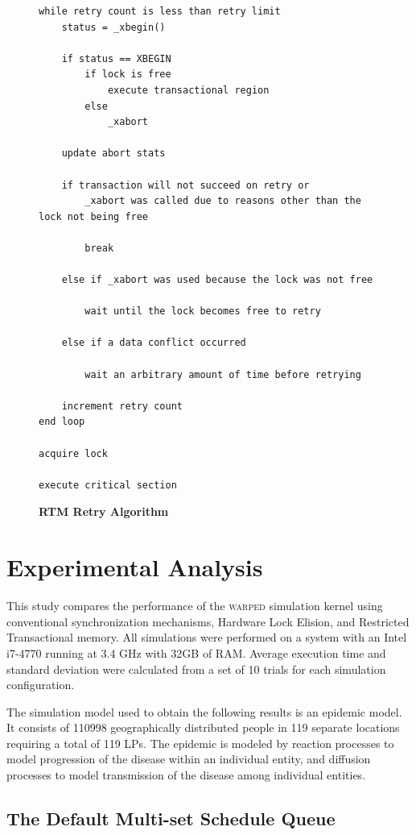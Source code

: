 \documentclass[11pt]{book}
\begin{document}
\begin{figure}
\begin{verbatim}
while retry count is less than retry limit
    status = _xbegin()

    if status == XBEGIN
        if lock is free
            execute transactional region
        else
            _xabort

    update abort stats

    if transaction will not succeed on retry or 
        _xabort was called due to reasons other than the lock not being free

        break

    else if _xabort was used because the lock was not free

        wait until the lock becomes free to retry

    else if a data conflict occurred
        
        wait an arbitrary amount of time before retrying

    increment retry count
end loop

acquire lock

execute critical section
\end{verbatim}
\caption{\textbf{RTM Retry Algorithm}}\label{rtm_retry}
\end{figure}

\chapter{Experimental Analysis}

This study compares the performance of the \textsc{warped} simulation kernel
using conventional synchronization mechanisms, Hardware Lock Elision, and
Restricted Transactional memory.  All simulations were performed on a system
with an Intel i7-4770 running at 3.4 GHz with 32GB of RAM.  Average execution
time and standard deviation were calculated from a set of 10 trials for each
simulation configuration.

The simulation model used to obtain the following results is an epidemic model.  It
consists of 110998 geographically distributed people in 119 separate locations requiring a
total of 119 LPs.  The epidemic is modeled by reaction processes to model progression of
the disease within an individual entity, and diffusion processes to model transmission of
the disease among individual entities.

\section{The Default Multi-set Schedule Queue}
\end{document}
